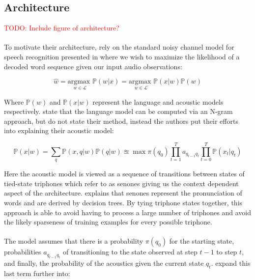 \documentclass[letterpaper]{article}
\newcommand{\TODO}[1]{\textcolor{red}{TODO: #1}}
\newcommand{\argmax}[1]{\underset{#1}{\text{argmax }}}
\newcommand{\cprob}[2]{ \prob{#1 \lvert #2} }
\newcommand{\prob}[1]{\mathbb{P}\left( #1 \right)}
\begin{document}
\subsection*{Architecture}

\TODO{Include figure of architecture?}

\paragraph{} To motivate their architecture, \cite{DBLP:journals/taslp/DahlYDA12} rely on the standard noisy channel model for speech recognition presented in \cite{jurafskyMartin} where we wish to maximize the likelihood of a decoded word sequence given our input audio observations:

\begin{equation}
\hat{w} = \argmax{w \in \mathscr{L}} \cprob{w}{x} = \argmax{w \in \mathscr{L}} \cprob{x}{w} \prob{w} 
\label{eqn:asr:def}
\end{equation}

Where $\prob{w}$ and $\cprob{x}{w}$ represent the language and acoustic models respectively. \cite{jurafskyMartin} state that the language model can be computed via an N-gram approach, but \cite{DBLP:journals/taslp/DahlYDA12} do not state their method, instead the authors put their efforts into explaining their acoustic model:

\begin{equation}
\cprob{x}{w} = \sum_{q} \cprob{x,q}{w} \cprob{q}{w} \approxeq \max \pi(q_0) \prod_{t = 1}^T a_{q_{t-1} q_t} \prod_{t=0}^T \cprob{x_t}{q_t} 
\label{eqn:lm:def}
\end{equation}

Here the acoustic model is viewed as a sequence of transitions between states of tied-state triphones which \cite{DBLP:journals/taslp/DahlYDA12} refer to as senones giving us the context dependent aspect of the architecture. \cite{DBLP:conf/interspeech/FerrerLMS14} explains that senones represent the pronunciation of words and are derived by decision trees. By tying triphone states together, this approach is able to avoid having to process a large number of triphones and avoid the likely sparseness of training examples for every possible triphone.

\paragraph{} The model assumes that there is a probability $\pi(q_0)$ for the starting state, probabilities $a_{q_{t-1} q_{t}}$ of transitioning to the state observed at step $t -1$ to step $t$, and finally, the probability of the acoustics given the current state $q_t$. \cite{DBLP:journals/taslp/DahlYDA12} expand this last term further into:
\end{document}
